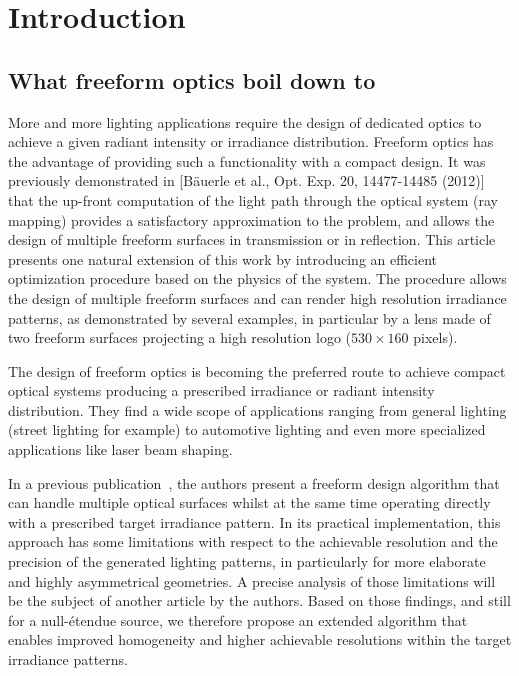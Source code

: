 \chapter{Introduction}
\label{ch:intro}


\section{What freeform optics boil down to}

More and more lighting applications require the design of dedicated
optics to achieve a given radiant intensity or irradiance distribution.
Freeform optics has the advantage of providing such a functionality
with a compact design.  It was previously demonstrated in
[B{\"{a}}uerle et al., Opt. Exp.  20, 14477-14485 (2012)] that the
up-front computation of the light path through the optical system (ray
mapping) provides a satisfactory approximation to the problem, and
allows the design of multiple freeform surfaces in transmission or in
reflection.  This article presents one natural extension of this work
by introducing an efficient optimization procedure based on the
physics of the system.  The procedure allows the design of multiple
freeform surfaces and can render high resolution irradiance patterns,
as demonstrated by several examples, in particular by a lens made of
two freeform surfaces projecting a high resolution logo ($530\times
160$ pixels).


The design of freeform optics is becoming the preferred route to
achieve compact optical systems producing a prescribed irradiance or
radiant intensity distribution.  They find a wide scope of applications ranging
from general lighting (street lighting for example) to automotive
lighting and even more specialized applications like laser beam
shaping.

In a previous publication~\cite{Baeuerle2012}, the authors present a
freeform design algorithm that can handle multiple optical surfaces
whilst at the same time operating directly with a prescribed target
irradiance pattern. In its practical implementation, this approach has
some limitations with respect to the achievable resolution and the
precision of the generated lighting patterns, in particularly for more
elaborate and highly asymmetrical geometries.  
A precise analysis of those limitations will be the subject of another
article by the authors.
Based on those
findings, and still for a null-\'{e}tendue source, we therefore
propose an extended algorithm that enables improved homogeneity and
higher achievable resolutions within the target irradiance patterns.

